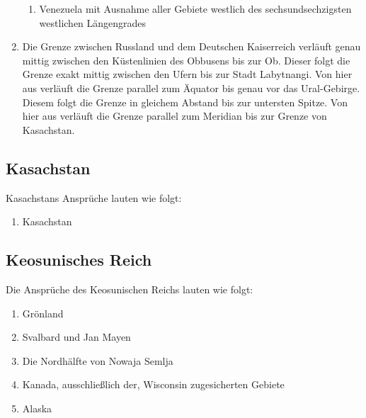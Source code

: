 \documentclass{article}
\begin{document}
\begin{enumerate}[(1)]
\begin{enumerate}[1.]
        \item Venezuela mit Ausnahme aller Gebiete westlich des sechsundsechzigsten westlichen Längengrades
    \end{enumerate}
    \item Die Grenze zwischen Russland und dem Deutschen Kaiserreich verläuft genau mittig zwischen den Küstenlinien des Obbusens bis zur Ob. Dieser folgt die Grenze exakt mittig zwischen den Ufern bis zur Stadt Labytnangi. Von hier aus verläuft die Grenze parallel zum Äquator bis genau vor das Ural-Gebirge. Diesem folgt die Grenze in gleichem Abstand bis zur untersten Spitze. Von hier aus verläuft die Grenze parallel zum Meridian bis zur Grenze von Kasachstan.    
\end{enumerate}

\subsection{Kasachstan}
Kasachstans Ansprüche lauten wie folgt:
\begin{enumerate}
    \item Kasachstan
\end{enumerate}

\subsection{Keosunisches Reich}
Die Ansprüche des Keosunischen Reichs lauten wie folgt:
\begin{enumerate}
    \item Grönland
    \item Svalbard und Jan Mayen
    \item Die Nordhälfte von Nowaja Semlja
    \item Kanada, ausschließlich der, Wisconsin zugesicherten Gebiete
    \item Alaska
\end{enumerate}
\end{document}

